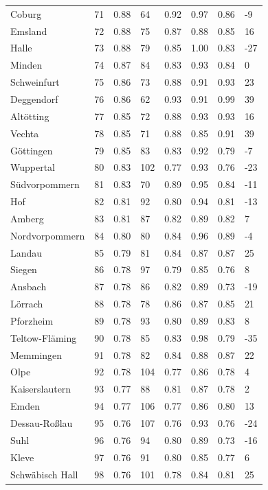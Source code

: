 \documentclass[11pt,a4paper]{article}
\begin{document}
{\begin{longtable}{llllllll}
Coburg & 71 & 0.88 & 64 & 0.92 & 0.97 & 0.86 & -9 \\
Emsland & 72 & 0.88 & 75 & 0.87 & 0.88 & 0.85 & 16 \\
Halle & 73 & 0.88 & 79 & 0.85 & 1.00 & 0.83 & -27 \\
Minden & 74 & 0.87 & 84 & 0.83 & 0.93 & 0.84 & 0 \\
Schweinfurt & 75 & 0.86 & 73 & 0.88 & 0.91 & 0.93 & 23 \\
Deggendorf & 76 & 0.86 & 62 & 0.93 & 0.91 & 0.99 & 39 \\
Altötting & 77 & 0.85 & 72 & 0.88 & 0.93 & 0.93 & 16 \\
Vechta & 78 & 0.85 & 71 & 0.88 & 0.85 & 0.91 & 39 \\
Göttingen & 79 & 0.85 & 83 & 0.83 & 0.92 & 0.79 & -7 \\
Wuppertal & 80 & 0.83 & 102 & 0.77 & 0.93 & 0.76 & -23 \\
Südvorpommern & 81 & 0.83 & 70 & 0.89 & 0.95 & 0.84 & -11 \\
Hof & 82 & 0.81 & 92 & 0.80 & 0.94 & 0.81 & -13 \\
Amberg & 83 & 0.81 & 87 & 0.82 & 0.89 & 0.82 & 7 \\
Nordvorpommern & 84 & 0.80 & 80 & 0.84 & 0.96 & 0.89 & -4 \\
Landau & 85 & 0.79 & 81 & 0.84 & 0.87 & 0.87 & 25 \\
Siegen & 86 & 0.78 & 97 & 0.79 & 0.85 & 0.76 & 8 \\
Ansbach & 87 & 0.78 & 86 & 0.82 & 0.89 & 0.73 & -19 \\
Lörrach & 88 & 0.78 & 78 & 0.86 & 0.87 & 0.85 & 21 \\
Pforzheim & 89 & 0.78 & 93 & 0.80 & 0.89 & 0.83 & 8 \\
Teltow-Fläming & 90 & 0.78 & 85 & 0.83 & 0.98 & 0.79 & -35 \\
Memmingen & 91 & 0.78 & 82 & 0.84 & 0.88 & 0.87 & 22 \\
Olpe & 92 & 0.78 & 104 & 0.77 & 0.86 & 0.78 & 4 \\
Kaiserslautern & 93 & 0.77 & 88 & 0.81 & 0.87 & 0.78 & 2 \\
Emden & 94 & 0.77 & 106 & 0.77 & 0.86 & 0.80 & 13 \\
Dessau-Roßlau & 95 & 0.76 & 107 & 0.76 & 0.93 & 0.76 & -24 \\
Suhl & 96 & 0.76 & 94 & 0.80 & 0.89 & 0.73 & -16 \\
Kleve & 97 & 0.76 & 91 & 0.80 & 0.85 & 0.77 & 6 \\
Schwäbisch Hall & 98 & 0.76 & 101 & 0.78 & 0.84 & 0.81 & 25 \\

\end{longtable}}
\end{document}
